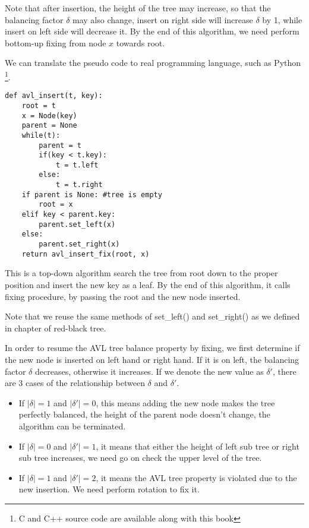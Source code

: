 \documentclass[UTF8]{article}
\begin{document}
Note that after insertion, the height of the tree may increase, so that
the balancing factor $\delta$ may also change, insert on right side will
increase $\delta$ by 1, while insert on left side will decrease it. By
the end of this algorithm, we need perform bottom-up fixing from node $x$
towards root.

We can translate the pseudo code to real programming language, such as
Python \footnote{C and C++ source code are available along with this book}.
\lstset{language=Python}
\begin{lstlisting}
def avl_insert(t, key):
    root = t
    x = Node(key)
    parent = None
    while(t):
        parent = t
        if(key < t.key):
            t = t.left
        else:
            t = t.right
    if parent is None: #tree is empty
        root = x
    elif key < parent.key:
        parent.set_left(x)
    else:
        parent.set_right(x)
    return avl_insert_fix(root, x)
\end{lstlisting}

This is a top-down algorithm search the tree from root down to the proper
position and insert the new key as a leaf. By the end of this algorithm, it calls fixing procedure, by passing the root and the new node inserted.

Note that we reuse the same methods of set\_left() and set\_right() as
we defined in chapter of red-black tree.

In order to resume the AVL tree balance property by fixing, we first determine if the new node is inserted on left hand or right hand. If it is on left, the balancing factor $\delta$ decreases, otherwise it increases. If we denote the new value as $\delta'$, there are 3 cases of the relationship between $\delta$ and $\delta'$.

\begin{itemize}
\item If $|\delta| = 1$ and $|\delta'| = 0$, this means adding the new node makes the tree perfectly balanced, the height of the parent node doesn't change, the algorithm can be terminated.

\item If $|\delta| = 0$ and $|\delta'| = 1$, it means that either the height of left sub tree or right sub tree increases, we need go on check the upper level of the tree.

\item If $|\delta| = 1$ and $|\delta'| = 2$, it means the AVL tree property is violated due to the new insertion. We need perform rotation to fix it.
\end{itemize}
\end{document}
